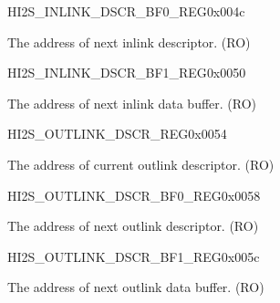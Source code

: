 \begin{register}{H}{I2S\_INLINK\_DSCR\_BF0\_REG}{0x004c}\label{regdesc:I2SINLINKDSCRBF0REG}
%
\regnewline%
\begin{regdesc}\begin{reglist}
\item [I2S\_INLINK\_DSCR\_BF0\_REG]The address of next inlink descriptor. (RO)
\end{reglist}\end{regdesc}
\end{register}


\begin{register}{H}{I2S\_INLINK\_DSCR\_BF1\_REG}{0x0050}\label{regdesc:I2SINLINKDSCRBF1REG}
%
\regnewline%
\begin{regdesc}\begin{reglist}
\item [I2S\_INLINK\_DSCR\_BF1\_REG]The address of next inlink data buffer. (RO)
\end{reglist}\end{regdesc}
\end{register}


\begin{register}{H}{I2S\_OUTLINK\_DSCR\_REG}{0x0054}\label{regdesc:I2SOUTLINKDSCRREG}
%
\regnewline%
\begin{regdesc}\begin{reglist}
\item [I2S\_OUTLINK\_DSCR\_REG]The address of current outlink descriptor. (RO)
\end{reglist}\end{regdesc}
\end{register}


\begin{register}{H}{I2S\_OUTLINK\_DSCR\_BF0\_REG}{0x0058}\label{regdesc:I2SOUTLINKDSCRBF0REG}
%
\regnewline%
\begin{regdesc}\begin{reglist}
\item [I2S\_OUTLINK\_DSCR\_BF0\_REG]The address of next outlink descriptor. (RO)
\end{reglist}\end{regdesc}
\end{register}


\begin{register}{H}{I2S\_OUTLINK\_DSCR\_BF1\_REG}{0x005c}\label{regdesc:I2SOUTLINKDSCRBF1REG}
%
\regnewline%
\begin{regdesc}\begin{reglist}
\item [I2S\_OUTLINK\_DSCR\_BF1\_REG]The address of next outlink data buffer. (RO)
\end{reglist}\end{regdesc}
\end{register}


